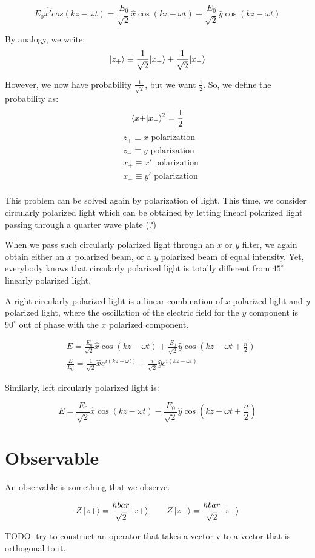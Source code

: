 \[
    E_0 \hat{x'} cos (k z - \omega t) 
    = \frac{E_0}{\sqrt 2} \hat x \cos (k z - \omega t) + \frac{E_0}{\sqrt 2} \hat y \cos (k z - \omega t)
\]

By analogy, we write:
\[
    |z_+\rangle \equiv  \frac{1}{\sqrt 2} |x_+\rangle + \frac{1}{\sqrt 2} |x_-\rangle
\]

However, we now have probability $\frac{1}{\sqrt 2}$, but we want $\frac{1}{2}$.
So, we define the probability as:
\[
    \bra{x+}\ket{x_-}^2 = \frac{1}{2}
\]
\begin{align*}
    &z_+ \equiv \text{$x$ polarization} \\
    &z_- \equiv \text{$y$ polarization} \\
    &x_+ \equiv \text{$x'$ polarization} \\
    &x_- \equiv \text{$y'$ polarization} \\
\end{align*}

This problem  can be solved again by polarization of light. This time,
we consider circularly polarized light which can be obtained by letting
linearl polarized light passing through a quarter wave plate (?)

When we pass such circularly polarized light through an $x$ or $y$ filter,
we again obtain either an $x$ polarized beam, or a $y$ polarized beam
of equal intensity. Yet, everybody knows that circularly polarized light
is totally different from $45^\circ$ linearly polarized light.

A right circularly polarized light is a linear combination of $x$ polarized
light and $y$ polarized light, where the oscillation of the electric field
for the $y$ component is $90^\circ$ out of phase with the $x$ polarized component.

\begin{align*}
    &E = \frac{E_0}{\sqrt 2} \hat x \cos (k z - \omega t) + 
    \frac{E_0}{\sqrt 2} \hat y \cos (k z - \omega t + \frac{n}{2}) \\
    &\frac{E}{E_0} = \frac{1}{\sqrt 2} \hat x e^{i(kz - \omega t)} + 
        \frac{i}{\sqrt 2}\hat y e^{i (k z - \omega t)}
    \end{align*}

Similarly, left circularly polarized light is:

\[
    E = \frac{E_0}{\sqrt 2} \hat x \cos (k z - \omega t) -
    \frac{E_0}{\sqrt 2} \hat y \cos (k z - \omega t + \frac{n}{2})
\]

\section{Observable}
An observable is something that we observe.

$$
Z \ket{z+} = \frac{hbar}{\sqrt 2} \ket{z+} \qquad
Z \ket{z-} = \frac{hbar}{\sqrt 2} \ket{z-} 
$$


TODO: try to construct an operator that takes a vector \ket v to a
vector that is orthogonal to it.
